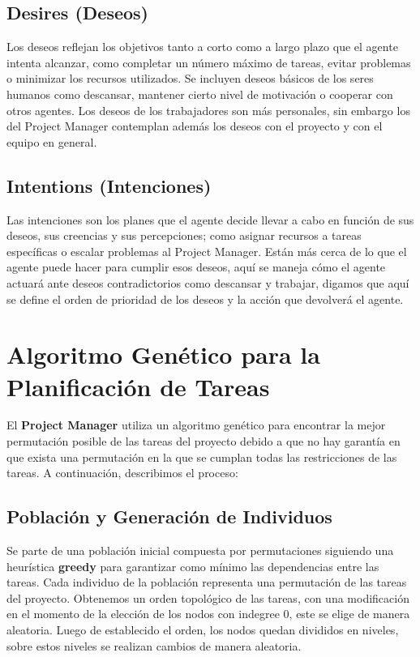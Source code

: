 \documentclass[a4paper, 12pt]{article}
\begin{document}
\subsection{Desires (Deseos)}
Los deseos reflejan los objetivos tanto a corto como a largo plazo que el agente intenta alcanzar, como completar un número máximo de tareas, evitar problemas o minimizar los recursos utilizados. Se incluyen deseos básicos de los seres humanos como descansar, mantener cierto nivel de motivación o cooperar con otros agentes. Los deseos de los trabajadores son más personales, sin embargo los del Project Manager contemplan además los deseos con el proyecto y con el equipo en general.

\subsection{Intentions (Intenciones)}
Las intenciones son los planes que el agente decide llevar a cabo en función de sus deseos, sus creencias y sus percepciones; como asignar recursos a tareas específicas o escalar problemas al Project Manager. Están más cerca de lo que el agente puede hacer para cumplir esos deseos, aquí se maneja cómo el agente actuará ante deseos contradictorios como descansar y trabajar, digamos que aquí se define el orden de prioridad de los deseos y la acción que devolverá el agente.

\section{Algoritmo Genético para la Planificación de Tareas}
El \textbf{Project Manager} utiliza un algoritmo genético para encontrar la mejor permutación posible de las tareas del proyecto debido a que no hay garant\'ia en que exista una permutación en la que se cumplan todas las restricciones de las tareas. A continuación, describimos el proceso:

\subsection{Población y Generación de Individuos}
Se parte de una población inicial compuesta por permutaciones siguiendo una heurística \textbf{greedy} para garantizar como m\'inimo las dependencias entre las tareas. Cada individuo de la población representa una permutación de las tareas del proyecto. Obtenemos un orden topol\'ogico de las tareas, con una modificaci\'on en el momento de la elecci\'on de los nodos con indegree $0$, este se elige de manera aleatoria. Luego de establecido el orden, los nodos quedan divididos en niveles, sobre estos niveles se realizan cambios de manera aleatoria.
\end{document}
